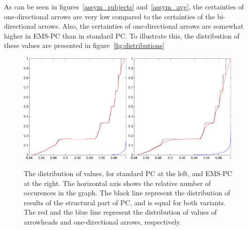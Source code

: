 \documentclass[a4paper, 10pt, english, onecolumn]{article}
\begin{document}
As can be seen in figures~\ref{assym_subjects} and~\ref{assym_avg}, the certainties of one-directional arrows are very low compared to the certainties of the bi-directional arrows. Also, the certainties of one-directional arrows are somewhat higher in EMS-PC than in standard PC. To illustrate this, the distribution of these values are presented in figure~\ref{fig:distributions}
\begin{figure}[h!]
  \centering
  \includegraphics[width=0.49\textwidth]{images/new/dist_all_mod_blackstruct_reddir_blueantisym-crop}
  \includegraphics[width=0.49\textwidth]{images/new/dist_all_expl_blackstruct_reddir_blueantisym-crop}
  \caption{The distribution of values, for standard PC at the left, and EMS-PC at the right. The horizontal axis shows the relative number of occurences in the graph. The black line represent the distribution of results of the structural part of PC, and is equal for both variants. The red and the blue line represent the distribution of values of arrowheads and one-directional arrows, respectively.}
  \label{fig:assym_avg}
\end{figure}
 
\end{document}
